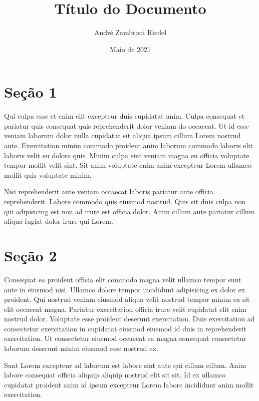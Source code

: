 \documentclass[12pt]{article}
\begin{document}
\thispagestyle{empty}


\title{\textbf{{\Huge Título do Documento}}}
\author{André Zambroni Riedel}
\date{Maio de 2021}

\maketitle

\newpage


\tableofcontents

\newpage

\setcounter{page}{1}

\section{Seção 1}

Qui culpa esse et enim elit excepteur duis cupidatat anim. Culpa consequat et pariatur quis consequat quis reprehenderit dolor veniam do occaecat. Ut id esse veniam laborum dolor nulla cupidatat sit aliqua ipsum cillum Lorem nostrud aute. Exercitation minim commodo proident anim laborum commodo laboris elit laboris velit eu dolore quis. Minim culpa sint veniam magna eu officia voluptate tempor mollit velit sint. Sit anim voluptate enim anim excepteur Lorem ullamco mollit quis voluptate minim.

Nisi reprehenderit aute veniam occaecat laboris pariatur aute officia reprehenderit. Labore commodo quis eiusmod nostrud. Quis sit duis culpa non qui adipisicing est non ad irure est officia dolor. Anim cillum aute pariatur cillum aliqua fugiat dolor irure qui Lorem.

\newpage

\section{Seção 2}

Consequat ea proident officia elit commodo magna velit ullamco tempor sunt aute in eiusmod nisi. Ullamco dolore tempor incididunt adipisicing ex dolor ex proident. Qui nostrud veniam eiusmod aliqua velit nostrud tempor minim ea sit elit occaecat magna. Pariatur exercitation officia irure velit cupidatat elit enim nostrud dolor. Voluptate esse proident deserunt exercitation. Duis exercitation ad consectetur exercitation in cupidatat eiusmod eiusmod id duis in reprehenderit exercitation. Ut consectetur eiusmod occaecat ea magna consequat consectetur laborum deserunt minim eiusmod esse nostrud ex.

Sunt Lorem excepteur ad laborum est labore sint aute qui cillum cillum. Anim labore consequat officia aliquip aliquip nostrud elit sit sit. Id ex ullamco cupidatat proident anim id ipsum excepteur Lorem labore incididunt anim mollit exercitation.
\end{document}
